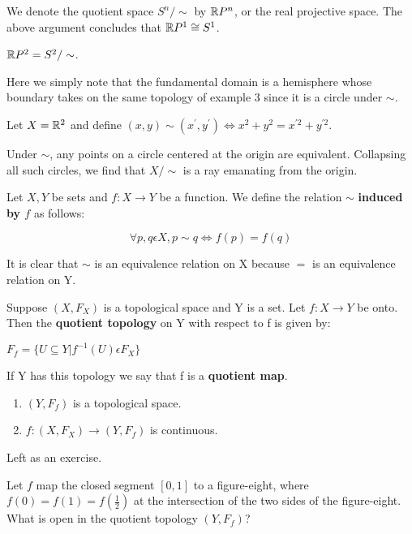 We denote the quotient space $S^{n}/\sim$ by $\mathbb R P^{n}$, or the real projective space. The above argument concludes that $\mathbb R P^{1} \cong S^{1}$. \placeholder
\begin{example}
	$\mathbb R P^{2} = S^{2}/\sim$.
	
	Here we simply note that the fundamental domain is a hemisphere whose boundary takes on the same topology of example 3 since it is a circle under $\sim$. 
\end{example}
\begin{example}
	Let $X=\mathbb R^{2}$ and define $(x,y)\sim(x^{'},y^{'}) \Leftrightarrow x^{2}+y^{2}=x^{'2}+y^{'2}$.
	
	Under $\sim$, any points on a circle centered at the origin are equivalent. Collapsing all such circles, we find that $X/\sim$ is a ray emanating from the origin. \placeholder 
\end{example}
\begin{definition}
	Let $X,Y$ be sets and $f: X \to Y$ be a function. We define the relation $\sim$ {\bf induced by $f$} as follows:
	
	\[\forall p,q \epsilon X, p \sim q \Leftrightarrow f(p)=f(q)\]
	
	It is clear that $\sim$ is an equivalence relation on X because $=$ is an equivalence relation on Y. 
\end{definition}
\begin{definition}
	Suppose $(X,F_{X})$ is a topological space and Y is a set. Let $f: X \to Y$ be onto. Then the {\bf quotient topology} on Y with respect to f is given by: 
	\begin{center}
		$F_{f}=\{U \subseteq Y | f^{-1}(U) \epsilon F_{X}\}$ 
	\end{center}
	If Y has this topology we say that f is a {\bf quotient map}. 
\end{definition}
\begin{tinyfact}
	\begin{enumerate}
		\item $(Y,F_f)$ is a topological space. 
		\item $f: (X,F_X) \rightarrow (Y,F_f)$ is continuous. 
	\end{enumerate}
\end{tinyfact}
\proof Left as an exercise.
\begin{example}
	Let $f$ map the closed segment $[0,1]$ to a figure-eight, where $f(0)=f(1)=f(\frac{1}{2})$ at the intersection of the two sides of the figure-eight. What is open in the quotient topology $(Y,F_f)$? 
\end{example}
